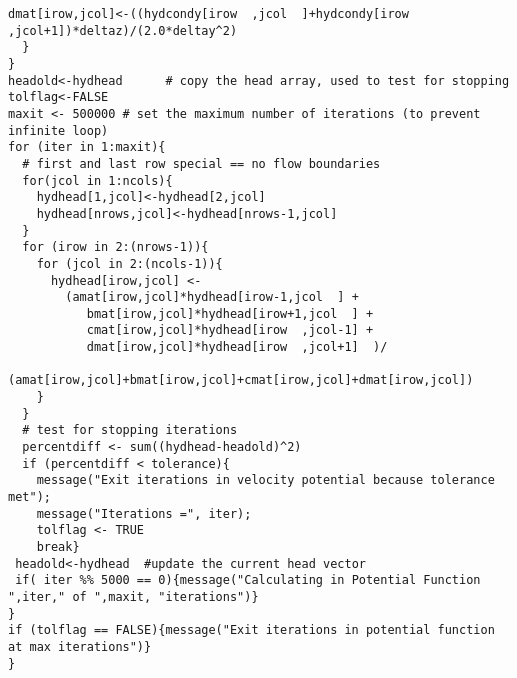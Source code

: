\begin{lstlisting}[caption= Velocity Potential Script , label=lst:2DinclusionVelocity]
    dmat[irow,jcol]<-((hydcondy[irow  ,jcol  ]+hydcondy[irow  ,jcol+1])*deltaz)/(2.0*deltay^2)
  }
}
headold<-hydhead      # copy the head array, used to test for stopping 
tolflag<-FALSE
maxit <- 500000 # set the maximum number of iterations (to prevent infinite loop)
for (iter in 1:maxit){
  # first and last row special == no flow boundaries
  for(jcol in 1:ncols){
    hydhead[1,jcol]<-hydhead[2,jcol]
    hydhead[nrows,jcol]<-hydhead[nrows-1,jcol]
  }
  for (irow in 2:(nrows-1)){
    for (jcol in 2:(ncols-1)){
      hydhead[irow,jcol] <- 
        (amat[irow,jcol]*hydhead[irow-1,jcol  ] +
           bmat[irow,jcol]*hydhead[irow+1,jcol  ] +
           cmat[irow,jcol]*hydhead[irow  ,jcol-1] +
           dmat[irow,jcol]*hydhead[irow  ,jcol+1]  )/
        (amat[irow,jcol]+bmat[irow,jcol]+cmat[irow,jcol]+dmat[irow,jcol])
    }
  }
  # test for stopping iterations
  percentdiff <- sum((hydhead-headold)^2)
  if (percentdiff < tolerance){
    message("Exit iterations in velocity potential because tolerance met");
    message("Iterations =", iter);
    tolflag <- TRUE
    break}
 headold<-hydhead  #update the current head vector
 if( iter %% 5000 == 0){message("Calculating in Potential Function ",iter," of ",maxit, "iterations")}
}
if (tolflag == FALSE){message("Exit iterations in potential function at max iterations")}
}\end{lstlisting}








